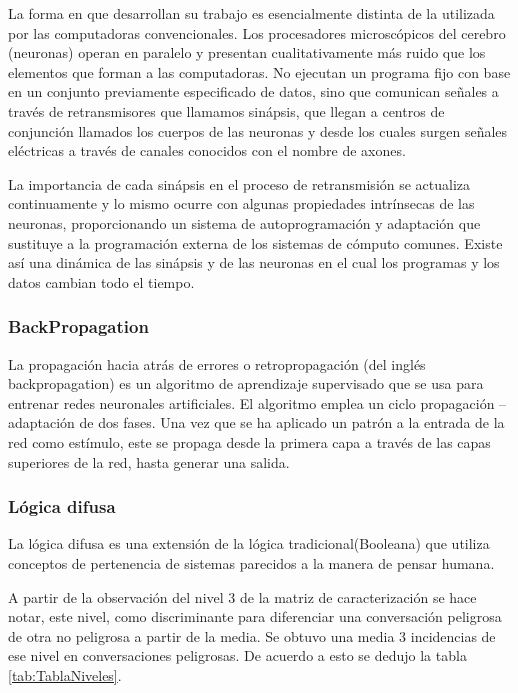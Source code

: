 La forma en que desarrollan su trabajo es esencialmente distinta de la utilizada por las computadoras convencionales. Los procesadores microsc\'opicos del cerebro (neuronas) operan en paralelo y presentan cualitativamente m\'as ruido que los elementos que forman a las computadoras. No ejecutan un programa fijo con base en un conjunto previamente especificado de datos, sino que comunican se\~nales a trav\'es de retransmisores que llamamos sin\'apsis, que llegan a centros de conjunci\'on llamados los cuerpos de las neuronas y desde los cuales surgen señales el\'ectricas a trav\'es de canales conocidos con el nombre de axones.

La importancia de cada sin\'apsis en el proceso de retransmisi\'on se actualiza continuamente y lo mismo ocurre con algunas propiedades intr\'insecas de las neuronas, proporcionando un sistema de autoprogramaci\'on y adaptaci\'on que sustituye a la programaci\'on externa de los sistemas de c\'omputo comunes. Existe as\'i una din\'amica de las sin\'apsis y de las neuronas en el cual los programas y los datos cambian todo el tiempo.

\subsubsection{BackPropagation}

La propagaci\'on hacia atr\'as de errores o retropropagaci\'on (del ingl\'es backpropagation) es un algoritmo de aprendizaje supervisado que se usa para entrenar redes neuronales artificiales. El algoritmo emplea un ciclo propagaci\'on – adaptaci\'on de dos fases. Una vez que se ha aplicado un patr\'on a la entrada de la red como est\'imulo, este se propaga desde la primera capa a trav\'es de las capas superiores de la red, hasta generar una salida. 

\subsubsection{L\'ogica difusa}
La l\'ogica difusa es una extensi\'on de la l\'ogica tradicional(Booleana) que utiliza conceptos de pertenencia de sistemas parecidos a la manera de pensar humana.

A partir de la  observaci\'on del nivel 3 de la matriz de caracterizaci\'on se hace notar, este nivel, como discriminante para diferenciar una conversaci\'on peligrosa de otra no peligrosa a partir de la media. Se obtuvo una media 3 incidencias de ese nivel en conversaciones peligrosas. De acuerdo a esto se dedujo la tabla \ref{tab:TablaNiveles}.



